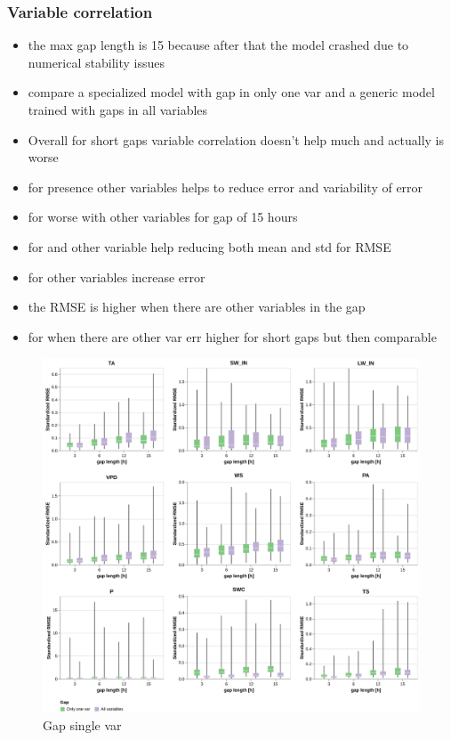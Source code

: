 \documentclass{article}
\newcommand{\imgwidth}{6in}
\begin{document}
\FloatBarrier

\subsubsection{Variable correlation}

\begin{itemize}
    \item the max gap length is 15 because after that the model crashed due to numerical stability issues
    \item compare a specialized model with gap in only one var and a generic model trained with gaps in all variables
    \item Overall for short gaps variable correlation doesn't help much and actually is worse
    \item for  presence other variables helps to reduce error and variability of error
    \item for  worse with other variables for gap of 15 hours
    \item for  and  other variable help reducing both mean and std for RMSE 
    \item for  other variables increase error
    \item {} the RMSE is higher when there are other variables in the gap
    \item for  when there are other var err higher for short gaps but then comparable
\end{itemize}

\begin{figure}
\centerline{\includegraphics[width=\imgwidth]{gap_single_var}}
\caption{Gap single var}
\label{fig:gap_single_var}
\end{figure}
\end{document}
